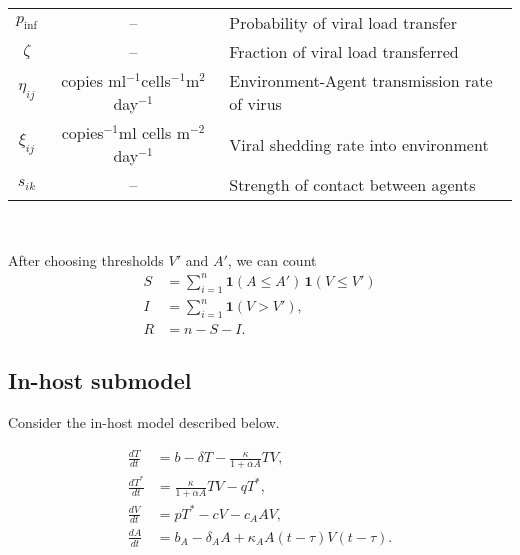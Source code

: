 \documentclass[11pt]{article}
\newcommand{\iv}{$^{-1}$}
\begin{document}
\begin{table}[h!]
\begin{tabular}{ccl}
            $p_\text{inf}$  & --
                                    & Probability of viral load transfer \\
            $\zeta$     & --
                                    & Fraction of viral load transferred \\
            $\eta_{ij}$ & copies ml\iv cells\iv m$^2$ day\iv
                                    & Environment-Agent transmission rate of virus\\
            $\xi_{ij}$  & copies\iv ml cells m$^{-2}$ day\iv
                                    & Viral shedding rate into environment \\
            $s_{ik}$    & --
                                    & Strength of contact between agents \\
            \hline
        \end{tabular}
        \label{tab:parameter}
    \end{table}

    ~

    After choosing thresholds $V'$ and $A'$, we can count \begin{align}
        S &= \sum_{i = 1}^n \mathbf{1}(A \leq A')\, \mathbf{1}(V \leq V') \\
        I &= \sum_{i = 1}^n \mathbf{1}(V > V'), \\
        R &= n - S - I.
    \end{align}


    \subsection{In-host submodel}

    Consider the in-host model described below.

    \begin{align*}
        \frac{dT}{dt} &= b -  \delta T - \frac{\kappa}{1 + \alpha A} TV, \\
        \frac{dT^*}{dt} &= \frac{\kappa}{1 + \alpha A} TV - qT^*, \\
        \frac{dV}{dt} &= pT^* - cV - c_A AV, \\
        \frac{dA}{dt} &= b_A -  \delta_A A + \kappa_A A(t - \tau)V(t - \tau).
    \end{align*}
\end{document}
